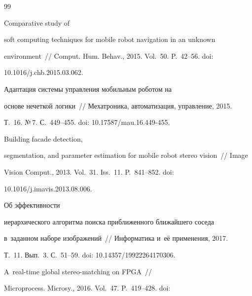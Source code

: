 {\small\frenchspacing


{%




\begin{thebibliography}{99}




 Comparative study of 


soft computing techniques for mobile robot navigation in an unknown 


environment~/\!\!/ Comput. Hum. Behav., 2015. Vol.~50. P.~42--56. doi: 


10.1016/j.chb.2015.03.062.







 Адаптация системы управления мобильным роботом на 


основе нечеткой логики~/\!\!/ Мехатроника, автоматизация, управление, 2015. 


Т.~16. №\,7. С.~449--455. doi: 10.17587/mau.16.449-455.







 Building facade detection, 


segmentation, and parameter estimation for mobile robot stereo vision~/\!\!/ Image 


Vision Comput., 2013. Vol.~31. Iss.~11. P.~841--852. doi: 


10.1016/j.imavis.2013.08.006.







 Об эффективности 


иерархического алгоритма поиска приближенного ближайшего соседа 


в~заданном наборе изображений~/\!\!/ Информатика и~её применения, 2017. 


Т.~11. Вып.~3. С.~51--59. doi: 10.14357/19922264170306.




 A~real-time global stereo-matching on \mbox{FPGA}~/\!\!/ 


Microprocess. Microsy., 2016. Vol.~47. P.~419--428. doi: 



\end{thebibliography}}}
